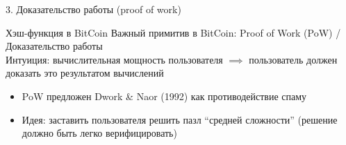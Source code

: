 \documentclass[usenames,dvipsnames,8pt,aspectratio=169]{beamer}
\begin{document}
\begin{frame}

\begin{LARGE}


\color{Orange}
3. Доказательство работы (proof of work)

\end{LARGE}
\end{frame}




\begin{frame}{Хэш-функция в  BitCoin}
\Large
Важный примитив в BitCoin: {\color{Orange} Proof of Work (PoW) / Доказательство работы} \\[10pt]
Интуиция: вычислительная мощность пользователя $\implies$ пользователь должен доказать это результатом вычислений \\
\vspace{15pt}
\begin{itemize}
\itemsep 1em
\item PoW предложен Dwork \& Naor (1992) как противодействие спаму
\item {\color{Orange} Идея:}  заставить пользователя решить пазл ``средней сложности''  (решение должно быть легко верифицировать)
\end{itemize}
\end{frame}
\end{document}
